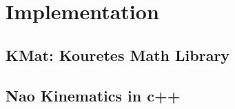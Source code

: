 \chapter{Implementation}
\label{Implementation}
\section{KMat: Kouretes Math Library}
\section{Nao Kinematics in c++}

